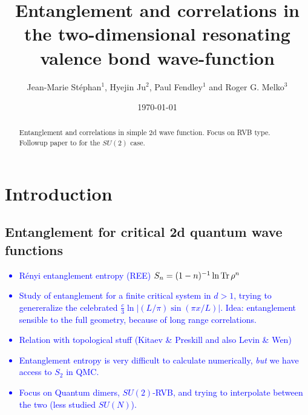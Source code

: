 \documentclass[11pt]{iopart}
\begin{document}
 
\title[Entanglement and Correlations in the 2D RVB wave function]{Entanglement and correlations in the two-dimensional resonating valence bond wave-function}
 
\author{Jean-Marie St\'ephan$^1$, Hyejin Ju$^2$, Paul Fendley$^1$ and Roger G. Melko$^3$}

\address{$^1$ Physics Department, University of Virginia, Charlottesville, VA 22904-4714}

\address{$^2$ Department of Physics, University of California, Santa Barbara, CA, 93106-9530}

\address{$^3$ Department of Physics and Astronomy, University of Waterloo, Ontario, N2L 3G1, Canada}


\date{\today}
\begin{abstract}
 Entanglement and correlations in simple 2d wave function. Focus on RVB type. Followup paper to \cite{Ju2012} for the $SU(2)$ case.
\end{abstract}
\maketitle

\tableofcontents

\section{Introduction}
\label{sec:introduction}
\subsection{Entanglement for critical 2d quantum wave functions}
\textcolor{blue}{
\begin{itemize}
\item R\'enyi entanglement entropy (REE) $S_n=(1-n)^{-1}\ln {\rm Tr}\, \rho^n$
 \item Study of entanglement for a finite critical system in $d>1$, trying to genereralize the celebrated $\frac{c}{3}\ln\left| (L/\pi)\sin (\pi x /L)\right|$. Idea: entanglement sensible to the full geometry, because of long range correlations. 
 \item Relation with topological stuff (Kitaev \& Preskill\cite{KP} and also Levin \& Wen\cite{LW})
 \item Entanglement entropy is very difficult to calculate numerically, \emph{but} we have access to $S_2$ in QMC\cite{swap}.
 \item Focus on Quantum dimers, $SU(2)$-RVB, and trying to interpolate between the two (less studied $SU(N)$).
\end{itemize}
}
\end{document}
